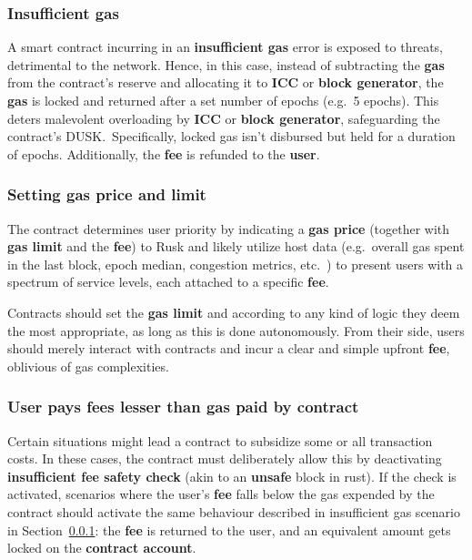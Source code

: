 \documentclass[twocolumn, nofootinbib]{revtex4-2} %
\newcommand{\dusk}{{\footnotesize\textsf{DUSK}}\xspace}
\newcommand{\emphathize}[1]{\textbf{#1}\xspace}
\newcommand{\blockgenerator}{\emphathize{block generator}}
\newcommand{\contractaccount}{\emphathize{contract account}}
\newcommand{\fee}{\emphathize{fee}}
\newcommand{\gas}{\emphathize{gas}}
\newcommand{\gasprice}{\emphathize{gas price}}
\newcommand{\gaslimit}{\emphathize{gas limit}}
\newcommand{\insufficientgas}{\emphathize{insufficient gas}}
\newcommand{\icc}{\emphathize{ICC}}
\newcommand{\user}{\emphathize{user}}
\begin{document}
    \subsubsection{Insufficient gas}\label{sec:specifications:scenario-3:insufficient-gas}
    A smart contract incurring in an \insufficientgas error is exposed
    to threats, detrimental to the network.
    Hence, in this case, instead of subtracting the \gas from the
    contract's reserve and allocating it to \icc or
    \blockgenerator, the \gas is locked and returned after a
    set number of epochs (e.g.\ 5 epochs).
    This deters malevolent overloading by \icc or
    \blockgenerator, safeguarding the contract's \dusk.\
    Specifically, locked gas isn't disbursed but held for a duration of epochs.
    Additionally, the \fee is refunded to the \user.

    \subsubsection{Setting gas price and limit}\label{sec:specifications:scenario-3:setting-gas-price-and-limit}
    The contract determines user priority by indicating a \gasprice
    (together with \gaslimit and the \fee) to Rusk and likely
    utilize host data (e.g.\ overall gas spent in the last block, epoch median,
    congestion metrics, etc.\ ) to present users with a spectrum of service
    levels, each attached to a specific \fee.

    Contracts should set the \gaslimit and  according
    to any kind of logic they deem the most appropriate, as long as this is done
    autonomously.
    From their side, users should merely interact with contracts and incur a
    clear and simple upfront \fee, oblivious of gas complexities.

    \subsubsection{User pays fees lesser than gas paid by contract}\label{sec:specifications:scenario-3:user-pays-fees-lesser}
    Certain situations might lead a contract to subsidize some or all
    transaction costs.
    In these cases, the contract must deliberately allow this by deactivating
    \textbf{insufficient fee safety check} (akin to an \textbf{unsafe} block in
    rust).
    If the check is activated, scenarios where the user's \fee falls below the
    gas expended by the contract should activate the same behaviour described
    in insufficient gas scenario in Section~\ref{sec:specifications:scenario-3:insufficient-gas}: the
    \fee is returned to the user, and an equivalent amount gets locked
    on the \contractaccount.
\end{document}
